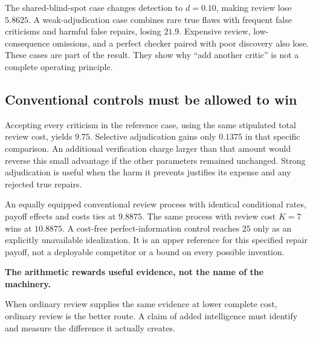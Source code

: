 \begin{table}[htbp]
\centering\small

\caption{Exact authored scenarios. The baseline is retaining the incumbent without additional review, with incremental value zero. ``Escaped'' denotes the target material defect receiving no accepted challenge under the evaluated review route. It is not a post-repair error rate or the realized defect rate of the selected action. If review is declined, the corresponding target-defect mass remains $\pi$. The full parameters and rational values are in the companion.}
\label{tab:results}
\end{table}

The shared-blind-spot case changes detection to $d=0.10$, making review lose $5.8625$. A weak-adjudication case combines rare true flaws with frequent false criticisms and harmful false repairs, losing $21.9$. Expensive review, low-consequence omissions, and a perfect checker paired with poor discovery also lose. These cases are part of the result. They show why ``add another critic'' is not a complete operating principle.

\subsection{Conventional controls must be allowed to win}
Accepting every criticism in the reference case, using the same stipulated total review cost, yields $9.75$. Selective adjudication gains only $0.1375$ in that specific comparison. An additional verification charge larger than that amount would reverse this small advantage if the other parameters remained unchanged. Strong adjudication is useful when the harm it prevents justifies its expense and any rejected true repairs.

An equally equipped conventional review process with identical conditional rates, payoff effects and costs ties at $9.8875$. The same process with review cost $K=7$ wins at $10.8875$. A cost-free perfect-information control reaches $25$ only as an explicitly unavailable idealization. It is an upper reference for this specified repair payoff, not a deployable competitor or a bound on every possible invention.

\begin{seabox}
\textbf{The arithmetic rewards useful evidence, not the name of the machinery.}\par
When ordinary review supplies the same evidence at lower complete cost, ordinary review is the better route. A claim of added intelligence must identify and measure the difference it actually creates.
\end{seabox}

